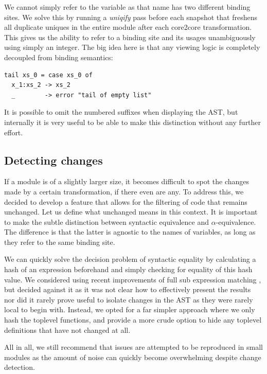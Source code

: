 We cannot simply refer to the variable  as that name has two different binding sites.
We solve this by running a \textit{uniqify} pass before each snapshot that freshens all duplicate uniques in the entire
module after each core2core transformation. This gives us the ability to refer to a binding site and its usages unambiguously using simply an integer.
The big idea here is that any viewing logic is completely decoupled from binding semantics:

\begin{listing}[H]
\begin{verbatim}
tail xs_0 = case xs_0 of
  x_1:xs_2 -> xs_2
  _        -> error "tail of empty list"
\end{verbatim}
\end{listing}

It is possible to omit the numbered suffixes when displaying the AST, but internally it is very useful to be able to make
this distinction without any further effort.

\subsection{Detecting changes}

If a module is of a slightly larger size, it becomes difficult to spot the changes made by a certain
transformation, if there even are any. To address this, we decided to develop a feature that allows for
the filtering of code that remains unchanged. Let us define what unchanged means in this context. It is
important to make the subtle distinction between syntactic equivalence and $\alpha$-equivalence. The difference
is that the latter is agnostic to the names of variables, as long as they refer to the same binding site.

We can quickly solve the decision problem of syntactic equality by calculating a hash of an expression beforehand
and simply checking for equality of this hash value. We considered using recent improvements of full sub expression
matching \cite{hashing_mod_alpha}, but decided against it as it was not clear how to effectively present the results
nor did it rarely prove useful to isolate changes in the AST as they were rarely local to begin with.
Instead, we opted for a far simpler approach where we only hash the toplevel functions, and provide a more crude
option to hide any toplevel definitions that have not changed at all.

All in all, we still recommend that issues are attempted to be reproduced in small modules as the amount of
noise can quickly become overwhelming despite change detection.

